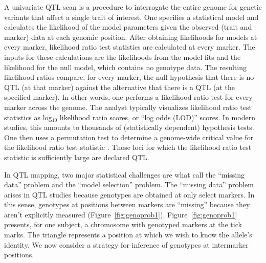 \documentclass[oneside]{book}\usepackage[]{graphicx}\usepackage[]{color}
\begin{document}
A univariate QTL scan is a procedure to interrogate the entire genome for genetic
variants that affect a single trait of interest.
One specifies a statistical model and calculates the
likelihood of the model parameters given the observed (trait and marker) data at each genomic position. 
After obtaining likelihoods for models at every marker, likelihood ratio test statistics are calculated
at every marker. The inputs for these calculations are the likelihoods from the model fits 
and the likelihood for the null model, which contains no genotype data.
The resulting likelihood ratios compare, for every marker, the null hypothesis that there is no 
QTL (at that marker) against the alternative that there is a QTL (at the specified marker).
In other words, one performs a likelihood ratio test for every marker across the genome.
The analyst typically visualizes likelihood ratio test
statistics as log$_{10}$ likelihood ratio scores, or ``log odds (LOD)'' scores.
In modern studies, this amounts to thousands of (statistically dependent)
hypothesis tests.
One then uses a permutation test to determine a genome-wide critical value
for the likelihood ratio test statistic \citep{churchill1994empirical}.
Those loci for which the likelihood ratio test statistic is sufficiently
large are declared QTL. 












In QTL mapping, two major statistical challenges are what \citet{broman2009guide} call 
the ``missing data'' problem and the ``model selection'' problem. 
The ``missing data'' problem arises in QTL studies because genotypes are obtained
at only select markers. In this sense, genotypes at positions between
markers are ``missing'' because they aren't explicitly measured
(Figure~\ref{fig:genoprob1}). Figure~\ref{fig:genoprob1} presents, for
one subject, a chromosome with genotyped markers at the tick marks.
The triangle represents a position at which we wish to know the allele's identity.
We now consider a strategy for inference of genotypes at intermarker positions.

\end{document}
